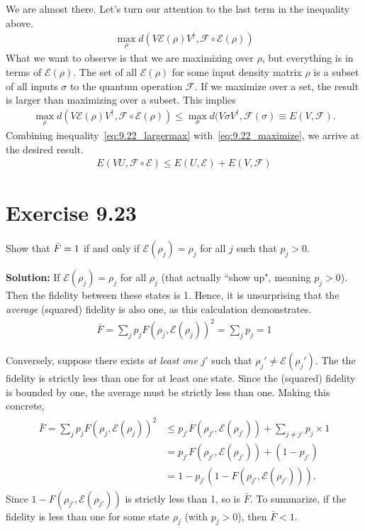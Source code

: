 \documentclass{book}
\newcommand{\mc}[1]{\mathcal{#1}}
\begin{document}
    We are almost there. Let's turn our attention to the last term in the inequality above.
    \begin{align}
        \max_\rho d(V \mc{E}(\rho) V^\dagger, \mc{F}\circ\mc{E}(\rho))
    \end{align}
    What we want to observe is that we are maximizing over $\rho$, but everything is in terms of $\mc{E}(\rho)$. The set of all $\mc{E}(\rho)$ for some input density matrix $\rho$ is a subset of all inputs $\sigma$ to the quantum operation $\mc{F}$. If we maximize over a set, the result is larger than maximizing over a subset. This implies
    \begin{align} \label{eq:9.22_largermax}
        \max_\rho d(V \mc{E}(\rho) V^\dagger, \mc{F}\circ\mc{E}(\rho)) \leq \max_\sigma d(V \sigma V^\dagger, \mc{F}(\sigma) \equiv E(V, \mc{F}).
    \end{align}
    Combining inequality~\eqref{eq:9.22_largermax} with~\eqref{eq:9.22_maximize}, we arrive at the desired result.
    \begin{align}
        E(VU, \mc{F}\circ\mc{E}) \leq E(U, \mc{E}) + E(V, \mc{F})
    \end{align}

\section*{Exercise 9.23}
    Show that $\Bar{F} = 1$ if and only if $\mc{E}(\rho_j) = \rho_j$ for all $j$ such that $p_j > 0$.

    \textbf{Solution:} If $\mc{E}(\rho_j) = \rho_j$ for all $\rho_j$ (that actually ``show up", meaning $p_j > 0$). Then the fidelity between these states is 1. Hence, it is unsurprising that the \emph{average} (squared) fidelity is also one, as this calculation demonstrates.
    \begin{align}
        \bar{F} = \sum_j p_j F(\rho_j, \mc{E}(\rho_j))^2 = \sum_j p_j = 1
    \end{align}

    Conversely, suppose there exists \emph{at least one} $j'$ such that $\rho_j' \neq \mc{E}(\rho_j')$. The the fidelity is strictly less than one for at least one state. Since the (squared) fidelity is bounded by one, the average must be strictly less than one. Making this concrete,
    \begin{align}
    \begin{aligned}
        \bar{F} = \sum_j p_j F(\rho_j, \mc{E}(\rho_j))^2 &\leq p_{j'} F(\rho_{j'}, \mc{E}(\rho_{j'})) + \sum_{j\neq j'} p_j  \times 1 \\
        &= p_{j'} F(\rho_{j'}, \mc{E}(\rho_{j'})) + (1-p_{j'}) \\
        &= 1 - p_{j'}(1 - F(\rho_{j'}, \mc{E}(\rho_{j'}))).
    \end{aligned}
    \end{align}
    Since $1 - F(\rho_{j'}, \mc{E}(\rho_{j'}))$ is strictly less than 1, so is $\bar{F}$. To summarize, if the fidelity is less than one for some state $\rho_j$ (with $p_j > 0$), then $\bar{F} < 1$.
\end{document}
